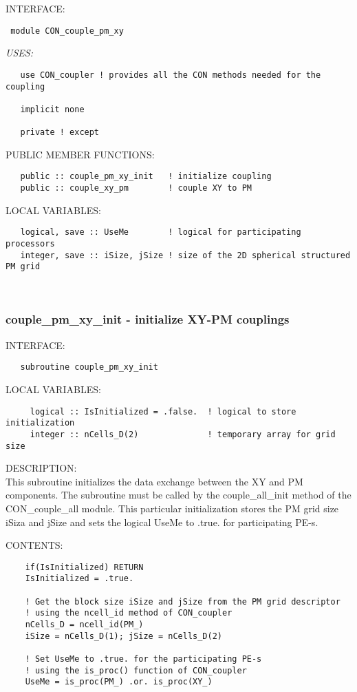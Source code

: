 \bigskip
{\sf INTERFACE:}
\begin{verbatim} module CON_couple_pm_xy
 \end{verbatim}
{\em USES:}
\begin{verbatim}   use CON_coupler ! provides all the CON methods needed for the coupling
 
   implicit none
 
   private ! except
 \end{verbatim}
{\sf PUBLIC MEMBER FUNCTIONS:}
\begin{verbatim}   public :: couple_pm_xy_init   ! initialize coupling
   public :: couple_xy_pm        ! couple XY to PM
 \end{verbatim}
{\sf LOCAL VARIABLES:}
\begin{verbatim}   logical, save :: UseMe        ! logical for participating processors
   integer, save :: iSize, jSize ! size of the 2D spherical structured PM grid
 \end{verbatim}
 
 
\mbox{}\hrulefill\ 
 
\subsubsection{ couple\_pm\_xy\_init - initialize XY-PM couplings}


\bigskip
{\sf INTERFACE:}
\begin{verbatim}   subroutine couple_pm_xy_init
 \end{verbatim}
{\sf LOCAL VARIABLES:}
\begin{verbatim}     logical :: IsInitialized = .false.  ! logical to store initialization
     integer :: nCells_D(2)              ! temporary array for grid size
 \end{verbatim}
{\sf DESCRIPTION:}\\
 
       This subroutine initializes the data exchange between the XY and PM
       components. The subroutine must be called by the couple\_all\_init
       method of the CON\_couple\_all module.
       This particular initialization stores the PM grid size iSiza and jSize
       and sets the logical UseMe to .true. for participating PE-s.


\bigskip
{\sf CONTENTS:}
\begin{verbatim}
    if(IsInitialized) RETURN
    IsInitialized = .true.

    ! Get the block size iSize and jSize from the PM grid descriptor 
    ! using the ncell_id method of CON_coupler
    nCells_D = ncell_id(PM_)
    iSize = nCells_D(1); jSize = nCells_D(2)

    ! Set UseMe to .true. for the participating PE-s
    ! using the is_proc() function of CON_coupler
    UseMe = is_proc(PM_) .or. is_proc(XY_)
 
\end{verbatim}
 
